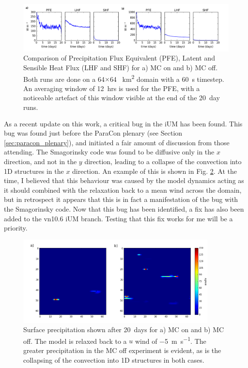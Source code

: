\documentclass[11pt,a4paper]{article}
\begin{document}
\begin{figure}[htp!]
    \centering
    \includegraphics[width=450px]{figures/surf_ts_plots_MC_on_off}
    \caption{Comparison of Precipitation Flux Equivalent (PFE), Latent and Sensible Heat Flux (LHF and SHF) for a) MC on and b) MC off. Both runs are done on a 64$\times$64 \SI{}{km^2} domain with a \SI{60}{s} timestep. An averaging window of \SI{12}{hrs} is used for the PFE, with a noticeable artefact of this window visible at the end of the \SI{20}{day} runs.}
    \label{fig:MC_on_off}
\end{figure}

As a recent update on this work, a critical bug in the iUM has been found. This bug was found just before the ParaCon plenary (see Section \ref{sec:paracon_plenary}), and initiated a fair amount of discussion from those attending. The Smagorinsky code was found to be diffusive only in the $x$ direction, and not in the $y$ direction, leading to a collapse of the convection into 1D structures in the $x$ direction. An example of this is shown in Fig. \ref{fig:precip_MC_on_off}. At the time, I believed that this behaviour was caused by the model dynamics acting as it should combined with the relaxation back to a mean wind across the domain, but in retrospect it appears that this is in fact a manifestation of the bug with the Smagorinsky code. Now that this bug has been identified, a fix has also been added to the vn10.6 iUM branch. Testing that this fix works for me will be a priority.

\begin{figure}[htp!]
    \centering
    \includegraphics[width=380px]{figures/surf_precip_MC_on_off}
    \caption{Surface precipitation shown after \SI{20}{days} for a) MC on and b) MC off. The model is relaxed back to a $u$ wind of \SI{-5}{m.s^{-1}}. The greater precipitation in the MC off experiment is evident, as is the collapsing of the convection into 1D structures in both cases. }
    \label{fig:precip_MC_on_off}
\end{figure}
\end{document}
